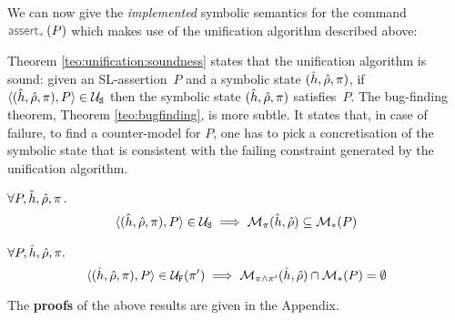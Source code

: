 We can now give the \emph{implemented} symbolic semantics for the command $\sepassert(P)$ 
which makes use of the unification algorithm described above: 
{\small {}}


Theorem \ref{teo:unification:soundness} states that the unification algorithm is sound: given an SL-assertion~$P$ and a 
symbolic state $(\sheap, \sstore, \pc)$, if $\unificationfullP{\sheap, \sstore, \pc}{P}{}$ then the symbolic state
$(\sheap, \sstore, \pc)$ satisfies~$P$. 
The bug-finding theorem, Theorem \ref{teo:bugfinding}, is more subtle. It states that, in case of failure,  to find a counter-model 
for $P$, one has to pick a concretisation of the symbolic state that is consistent with 
the failing constraint generated by the unification algorithm. 



\begin{theorem}\label{teo:unification:soundness}
$\forall P, \sheap, \sstore, \pc \, .$
$$
\begin{array}{l}
   \unificationfullP{\sheap, \sstore, \pc}{P}{}
    \implies \smodels{\sheap, \sstore}{\pc} \subseteq \sepmodels{P}   
\end{array}
$$ 
\end{theorem}


\begin{theorem}\label{teo:bugfinding}
$\forall P, \sheap, \sstore, \pc.$
$$
\unificationfullfailP{\sheap, \sstore, \pc}{P}{\pc'} \implies 
   \smodels{\sheap, \sstore}{\pc \wedge \pc'} \cap \sepmodels{P} = \emptyset
$$ 
\end{theorem}
%
The {\bf proofs} of the above results are given in the Appendix.


